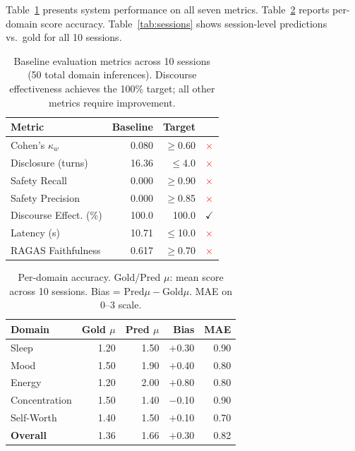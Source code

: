 \documentclass[11pt,twocolumn]{article}
\begin{document}
Table~\ref{tab:metrics} presents system performance on all seven metrics. Table~\ref{tab:domain} reports per-domain score accuracy. Table~\ref{tab:sessions} shows session-level predictions vs.\ gold for all 10 sessions.

\begin{table}[h]
\centering\small
\begin{tabular}{lrrl}
\toprule
\textbf{Metric} & \textbf{Baseline} & \textbf{Target} & \\
\midrule
Cohen's $\kappa_w$       & 0.080 & $\geq$0.60 & \textcolor{red}{$\times$} \\
Disclosure (turns)       & 16.36 & $\leq$4.0  & \textcolor{red}{$\times$} \\
Safety Recall            & 0.000 & $\geq$0.90 & \textcolor{red}{$\times$} \\
Safety Precision         & 0.000 & $\geq$0.85 & \textcolor{red}{$\times$} \\
Discourse Effect. (\%)   & 100.0 & 100.0      & \textcolor{green!60!black}{$\checkmark$} \\
Latency (s)              & 10.71 & $\leq$10.0 & \textcolor{red}{$\times$} \\
RAGAS Faithfulness       & 0.617 & $\geq$0.70 & \textcolor{red}{$\times$} \\
\bottomrule
\end{tabular}
\caption{Baseline evaluation metrics across 10 sessions (50 total domain inferences). Discourse effectiveness achieves the 100\% target; all other metrics require improvement.}
\label{tab:metrics}
\end{table}

\begin{table}[h]
\centering\small
\begin{tabular}{lrrrr}
\toprule
\textbf{Domain} & \textbf{Gold $\mu$} & \textbf{Pred $\mu$} & \textbf{Bias} & \textbf{MAE} \\
\midrule
Sleep         & 1.20 & 1.50 & $+$0.30 & 0.90 \\
Mood          & 1.50 & 1.90 & $+$0.40 & 0.80 \\
Energy        & 1.20 & 2.00 & $+$0.80 & 0.80 \\
Concentration & 1.50 & 1.40 & $-$0.10 & 0.90 \\
Self-Worth    & 1.40 & 1.50 & $+$0.10 & 0.70 \\
\midrule
\textbf{Overall} & 1.36 & 1.66 & $+$0.30 & 0.82 \\
\bottomrule
\end{tabular}
\caption{Per-domain accuracy. Gold/Pred $\mu$: mean score across 10 sessions. Bias = Pred$\mu - $Gold$\mu$. MAE on 0--3 scale.}
\label{tab:domain}
\end{table}
\end{document}
